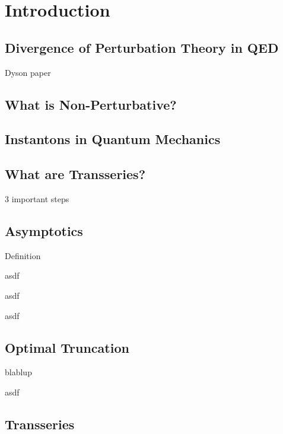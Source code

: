 \chapter{Introduction}
\begin{refsection}
    \nocite{marino_lectures_2014, costin_physical_2020, hatsuda_quasinormal_2020, dorigoni_introduction_2015, aniceto_primer_2019, bender_anharmonic_1969, bender_anharmonic_1973, muller-kirsten_introduction_2012,}

\printbibliography[heading = subbibliography]

\section{Divergence of Perturbation Theory in QED}
Dyson paper~\cite{dyson_divergence_1952}

\section{What is Non-Perturbative?}

\section{Instantons in Quantum Mechanics}

\section{What are Transseries?}
\cite{marino_lectures_2014}

3 important steps

\section{Asymptotics}
Definition

\begin{example}
    asdf
\end{example}

\begin{example}
    asdf
\end{example}

\begin{example}
    asdf
\end{example}

\section{Optimal Truncation}
blablup

\begin{example}
    asdf
\end{example}

\section{Transseries}


\end{refsection}
